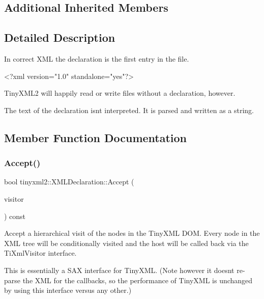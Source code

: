 \subsection*{Additional Inherited Members}


\subsection{Detailed Description}
In correct X\+ML the declaration is the first entry in the file. \begin{DoxyVerb}    <?xml version="1.0" standalone="yes"?>
\end{DoxyVerb}


Tiny\+X\+M\+L2 will happily read or write files without a declaration, however.

The text of the declaration isn\textquotesingle{}t interpreted. It is parsed and written as a string. 

\subsection{Member Function Documentation}
\mbox{\label{classtinyxml2_1_1XMLDeclaration_acf47629d9fc08ed6f1c164a97bcf794b}} 
\subsubsection{\texorpdfstring{Accept()}{Accept()}\hspace{0.1cm}{\footnotesize\ttfamily [1/2]}}
{\footnotesize\ttfamily bool tinyxml2\+::\+X\+M\+L\+Declaration\+::\+Accept (\begin{DoxyParamCaption}\item[{\hyperlink{classtinyxml2_1_1XMLVisitor}{X\+M\+L\+Visitor} $\ast$}]{visitor }\end{DoxyParamCaption}) const\hspace{0.3cm}{\ttfamily [virtual]}}

Accept a hierarchical visit of the nodes in the Tiny\+X\+ML D\+OM. Every node in the X\+ML tree will be conditionally visited and the host will be called back via the Ti\+Xml\+Visitor interface.

This is essentially a S\+AX interface for Tiny\+X\+ML. (Note however it doesn\textquotesingle{}t re-\/parse the X\+ML for the callbacks, so the performance of Tiny\+X\+ML is unchanged by using this interface versus any other.)

